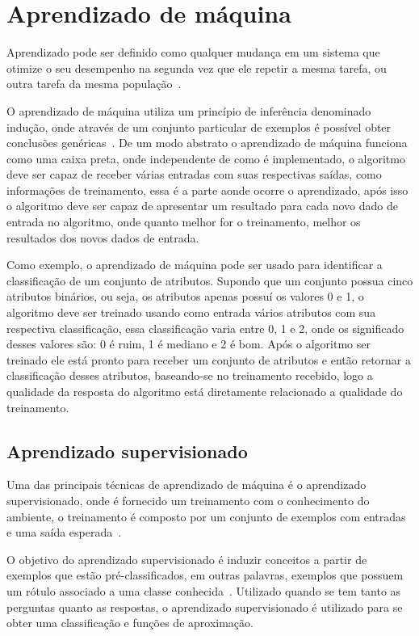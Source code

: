 \section{Aprendizado de máquina}

Aprendizado pode ser definido como qualquer mudança em um sistema que
otimize o seu desempenho na segunda vez que ele repetir a mesma tarefa,
ou outra tarefa da mesma população~\cite{custodio2010aprendizadomaquina}.

O aprendizado de máquina utiliza um princípio de inferência denominado
indução, onde através de um conjunto particular de exemplos é possível
obter conclusões genéricas~\cite{bruno2010aprendizadomaquina}. De um modo
abstrato o aprendizado de máquina funciona como uma caixa preta, onde
independente de como é implementado, o algoritmo deve ser capaz de receber
várias entradas com suas respectivas saídas, como informações de treinamento,
essa é a parte aonde ocorre o aprendizado, após isso o algoritmo deve
ser capaz de apresentar um resultado para cada novo dado de entrada no
algoritmo, onde quanto melhor for o treinamento, melhor os resultados
dos novos dados de entrada.

Como exemplo, o aprendizado de máquina pode ser usado para identificar
a classificação de um conjunto de atributos. Supondo que um conjunto
possua cinco atributos binários, ou seja, os atributos apenas possuí os
valores 0 e 1, o algoritmo deve ser treinado usando como entrada vários
atributos com sua respectiva classificação, essa classificação
varia entre 0, 1 e 2, onde os significado desses valores são: 0 é ruim,
1 é mediano e 2 é bom. Após o algoritmo ser treinado ele está pronto
para receber um conjunto de atributos e então retornar a classificação
desses atributos, baseando-se no treinamento recebido, logo a qualidade
da resposta do algoritmo está diretamente relacionado a qualidade do
treinamento.

\subsection{Aprendizado supervisionado}

Uma das principais técnicas de aprendizado de máquina é o aprendizado
supervisionado, onde é fornecido um treinamento com o conhecimento do
ambiente, o treinamento é composto por um conjunto de exemplos com entradas
e uma saída esperada~\cite{bruno2010aprendizadomaquina}.

O objetivo do aprendizado supervisionado é induzir conceitos a partir de
exemplos que estão pré-classificados, em outras palavras, exemplos que
possuem um rótulo associado a uma classe conhecida~\cite{bruno2010aprendizadomaquina}.
Utilizado quando se tem tanto as perguntas quanto as respostas, o aprendizado
supervisionado é utilizado para se obter uma classificação e funções de aproximação.

